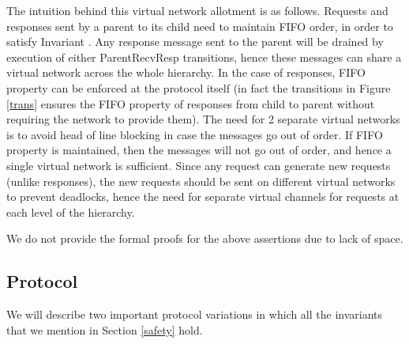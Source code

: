 The intuition behind this virtual network allotment is as follows. Requests and
responses sent by a parent to its child need to maintain FIFO order, in order
to satisfy Invariant \label{noCross}. Any response message sent to the parent
will be drained by execution of either ParentRecvResp transitions, hence these
messages can share a virtual network across the whole hierarchy. In the case of
responses, FIFO property can be enforced at the protocol itself (in fact the
transitions in Figure \ref{trans} ensures the FIFO property of responses from
child to parent without requiring the network to provide them). The need for 2
separate virtual networks is to avoid head of line blocking in case the
messages go out of order. If FIFO property is maintained, then the messages
will not go out of order, and hence a single virtual network is sufficient.
Since any request can generate new requests (unlike responses), the new
requests should be sent on different virtual networks to prevent deadlocks,
hence the need for separate virtual channels for requests at each level of the
hierarchy.

We do not provide the formal proofs for the above assertions due to lack of space.

\subsection{Protocol}
We will describe two important protocol variations in which all the invariants
that we mention in Section \ref{safety} hold.
